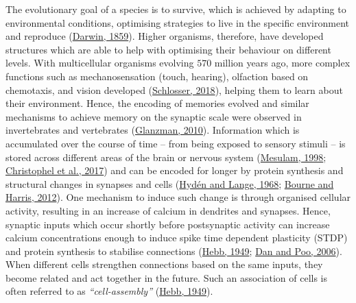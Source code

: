\documentclass[
  12pt,
  a4paper,
  openany]{book}
\begin{document}
The evolutionary goal of a species is to survive, which is achieved by adapting to environmental conditions, optimising strategies to live in the specific environment and reproduce (\protect\hyperlink{ref-darwin_origin_1859}{Darwin, 1859}). Higher organisms, therefore, have developed structures which are able to help with optimising their behaviour on different levels. With multicellular organisms evolving \(570\) million years ago, more complex functions such as mechanosensation (touch, hearing), olfaction based on chemotaxis, and vision developed (\protect\hyperlink{ref-schlosser_short_2018}{Schlosser, 2018}), helping them to learn about their environment. Hence, the encoding of memories evolved and similar mechanisms to achieve memory on the synaptic scale were observed in invertebrates and vertebrates (\protect\hyperlink{ref-glanzman_common_2010}{Glanzman, 2010}). Information which is accumulated over the course of time -- from being exposed to sensory stimuli -- is stored across different areas of the brain or nervous system (\protect\hyperlink{ref-mesulam_sensation_1998}{Mesulam, 1998}; \protect\hyperlink{ref-christophel_distributed_2017}{Christophel et al., 2017}) and can be encoded for longer by protein synthesis and structural changes in synapses and cells (\protect\hyperlink{ref-hyden_protein_1968}{Hydén and Lange, 1968}; \protect\hyperlink{ref-bourne_nanoscale_2012}{Bourne and Harris, 2012}). One mechanism to induce such change is through organised cellular activity, resulting in an increase of calcium in dendrites and synapses. Hence, synaptic inputs which occur shortly before postsynaptic activity can increase calcium concentrations enough to induce spike time dependent plasticity (STDP) and protein synthesis to stabilise connections (\protect\hyperlink{ref-hebb_organization_1949}{Hebb, 1949}; \protect\hyperlink{ref-dan_spike_2006}{Dan and Poo, 2006}). When different cells strengthen connections based on the same inputs, they become related and act together in the future. Such an association of cells is often referred to as \emph{``cell-assembly''} (\protect\hyperlink{ref-hebb_organization_1949}{Hebb, 1949}).
\end{document}
